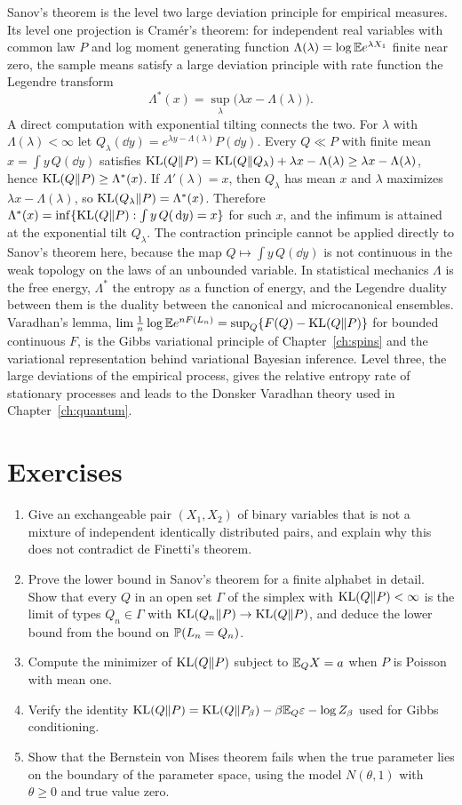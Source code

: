 Sanov's theorem is the level two large deviation principle for empirical measures. Its level one projection is Cram\'er's theorem: for independent real variables with common law $P$ and log moment generating function $\Lambda(\lambda) = \log\E e^{\lambda X_1}$ finite near zero, the sample means satisfy a large deviation principle with rate function the Legendre transform
\[
\Lambda^*(x) = \sup_\lambda\big(\lambda x-\Lambda(\lambda)\big).
\]
A direct computation with exponential tilting connects the two. For $\lambda$ with $\Lambda(\lambda)<\infty$ let $Q_\lambda(\dd y) = e^{\lambda y-\Lambda(\lambda)}P(\dd y)$. Every $Q\ll P$ with finite mean $x = \int y\,Q(\dd y)$ satisfies $\KL(Q\|P) = \KL(Q\|Q_\lambda)+\lambda x-\Lambda(\lambda)\geq\lambda x-\Lambda(\lambda)$, hence $\KL(Q\|P)\geq\Lambda^*(x)$. If $\Lambda'(\lambda) = x$, then $Q_\lambda$ has mean $x$ and $\lambda$ maximizes $\lambda x-\Lambda(\lambda)$, so $\KL(Q_\lambda\|P) = \Lambda^*(x)$. Therefore $\Lambda^*(x) = \inf\{\KL(Q\|P):\int y\,Q(\dd y) = x\}$ for such $x$, and the infimum is attained at the exponential tilt $Q_\lambda$. The contraction principle cannot be applied directly to Sanov's theorem here, because the map $Q\mapsto\int y\,Q(\dd y)$ is not continuous in the weak topology on the laws of an unbounded variable. In statistical mechanics $\Lambda$ is the free energy, $\Lambda^*$ the entropy as a function of energy, and the Legendre duality between them is the duality between the canonical and microcanonical ensembles. Varadhan's lemma, $\lim\frac1n\log\E e^{nF(L_n)} = \sup_Q\{F(Q)-\KL(Q\|P)\}$ for bounded continuous $F$, is the Gibbs variational principle of Chapter~\ref{ch:spins} and the variational representation behind variational Bayesian inference. Level three, the large deviations of the empirical process, gives the relative entropy rate of stationary processes and leads to the Donsker Varadhan theory used in Chapter~\ref{ch:quantum}.

\section*{Exercises}
\begin{enumerate}
\item Give an exchangeable pair $(X_1,X_2)$ of binary variables that is not a mixture of independent identically distributed pairs, and explain why this does not contradict de Finetti's theorem.
\item Prove the lower bound in Sanov's theorem for a finite alphabet in detail. Show that every $Q$ in an open set $\Gamma$ of the simplex with $\KL(Q\|P)<\infty$ is the limit of types $Q_n\in\Gamma$ with $\KL(Q_n\|P)\to\KL(Q\|P)$, and deduce the lower bound from the bound on $\P(L_n = Q_n)$.
\item Compute the minimizer of $\KL(Q\|P)$ subject to $\E_QX = a$ when $P$ is Poisson with mean one.
\item Verify the identity $\KL(Q\|P) = \KL(Q\|P_\beta)-\beta\E_Q\varepsilon-\log Z_\beta$ used for Gibbs conditioning.
\item Show that the Bernstein von Mises theorem fails when the true parameter lies on the boundary of the parameter space, using the model $N(\theta,1)$ with $\theta\geq0$ and true value zero.
\end{enumerate}
